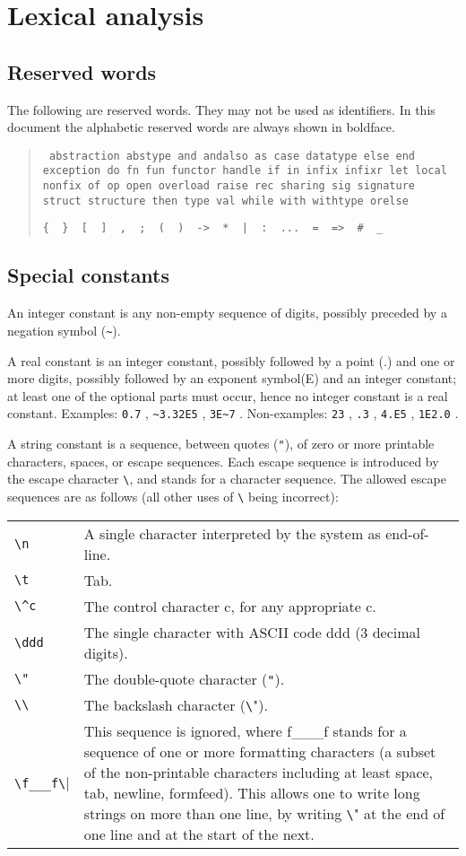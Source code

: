 \chapter{Lexical analysis}
\section{Reserved words}
The following are reserved words.   They may not be used as
identifiers.  In this document the alphabetic reserved words are always
shown in boldface.
\begin{quote}
\raggedright
\tt
abstraction abstype and andalso
as case datatype else end exception do fn fun functor handle if in 
infix infixr let local nonfix of op open overload 
raise rec sharing sig signature
struct structure then type val while with withtype orelse

\verb"{  }  [  ]  ,  ;  (  )  ->  *  |  :  ...  =  =>  #  _"
\end{quote}
\section{Special constants}
An integer constant is any non-empty sequence of digits, possibly preceded
by a negation symbol (\verb|~|).

A real constant is an integer constant, possibly followed by a point (.)
and one or more digits, possibly followed by an exponent symbol(E) and
an integer constant; at least one of the optional parts must occur,
hence no integer constant is a real constant.  Examples: \verb|0.7| ,
\verb|~3.32E5| , \verb|3E~7| .  Non-examples: \verb|23| , \verb|.3| ,
\verb|4.E5| , \verb|1E2.0| .

A string constant is a sequence, between quotes (\verb|"|), of zero or more
printable characters, spaces, or escape sequences.  Each escape sequence
is introduced by the escape character \verb|\|, and stands for a character
sequence.  The allowed escape sequences are as follows (all other
uses of \verb|\| being incorrect):
\begin{tabular}{l p{3.9in}}
\verb|\n| & A single character interpreted by the system as end-of-line.\\
\verb|\t| & Tab. \\
\verb|\^c| & The control character c, for any appropriate c.\\
\verb|\ddd| &  The single character with ASCII code ddd (3 decimal digits).\\
\verb|\"| & The double-quote character (\verb'"'). \\
\verb|\\| &  The backslash character (\verb"\").\\
\verb|\f___f\| & This sequence is ignored, where f\_\_\_f stands for a
sequence of one or more formatting characters (a subset of the
non-printable characters including at least space, tab, newline,
formfeed).  This allows one to write long strings on more than one
line, by writing \verb"\" at the end of one line and at the start of the
next.
\end{tabular}

